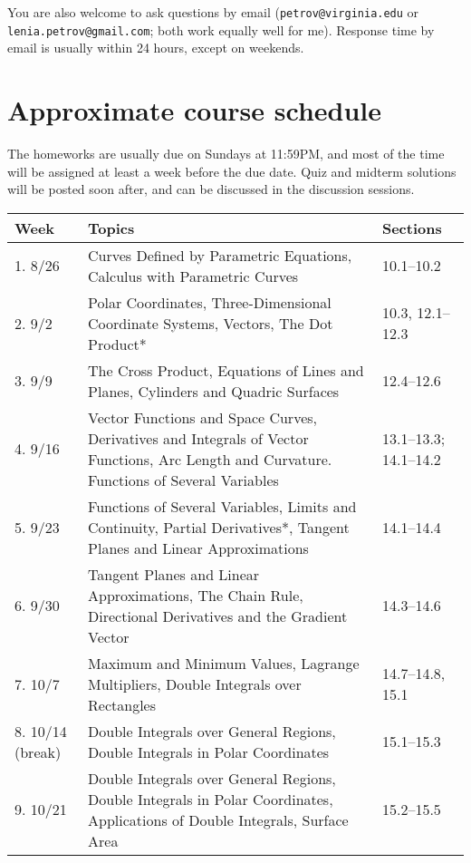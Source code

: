 \documentclass[oneside,11pt]{amsart}
\theoremstyle{definition}
\begin{document}
You are also welcome to ask questions by email (\texttt{petrov@virginia.edu} or
\texttt{lenia.petrov@gmail.com}; both work equally well for me). Response time by email is usually within 24 hours, except on weekends.

\section{Approximate course schedule}

The homeworks are usually due on Sundays at 11:59PM, and most of the time will be assigned at least a week before the due date. Quiz and midterm solutions will be posted soon after, and can be discussed in the discussion sessions.

\newpage
\begin{center}
\begin{longtable}{|l|p{}|l|}
    \hline
    \textbf{Week} & \textbf{Topics} & \textbf{Sections} \\
    \hline
    1. 8/26 & Curves Defined by Parametric Equations, Calculus with Parametric Curves & 10.1--10.2 \\
    \hline
    2. 9/2 & Polar Coordinates, Three-Dimensional Coordinate Systems, Vectors, The Dot Product* & 10.3, 12.1--12.3 \\
    \hline
		3. 9/9 & The Cross Product, Equations of Lines and Planes, Cylinders and Quadric Surfaces & 12.4--12.6 \\
    \hline
		4. 9/16 & Vector Functions and Space Curves, Derivatives and Integrals of Vector Functions, Arc Length and Curvature. 
		Functions of Several Variables
		& 13.1--13.3; 14.1--14.2 \\
    \hline
    5. 9/23 & Functions of Several Variables, Limits and Continuity, Partial Derivatives*, Tangent Planes and Linear Approximations & 14.1--14.4 \\
    \hline
    6. 9/30 & Tangent Planes and Linear Approximations, The Chain Rule, Directional Derivatives and the Gradient Vector & 14.3--14.6 \\
    \hline
		7. 10/7 & Maximum and Minimum Values, Lagrange Multipliers, Double Integrals over Rectangles & 14.7--14.8, 15.1 \\
    \hline
		8. 10/14 (break) & Double Integrals over General Regions, Double Integrals in Polar Coordinates & 15.1--15.3 \\
    \hline
		9. 10/21 & Double Integrals over General Regions, Double Integrals in Polar Coordinates, 
		Applications of Double Integrals, Surface Area & 15.2--15.5 \\

\end{longtable}
\end{center}
\end{document}
